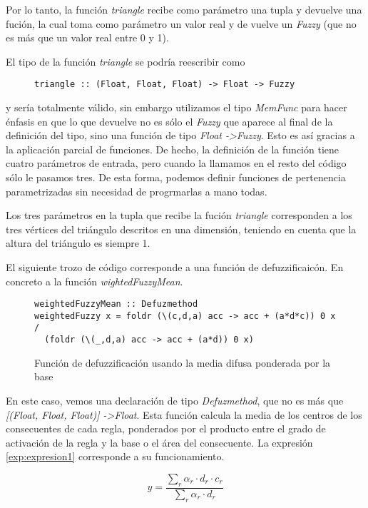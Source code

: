 Por lo tanto, la función \emph{triangle} recibe como parámetro una
tupla y devuelve una fución, la cual toma como parámetro un valor real
y de vuelve un \emph{Fuzzy} (que no es más que un valor real entre 0 y
1).

El tipo de la función \emph{triangle} se podría reescribir como
\begin{figure}
\begin{lstlisting}
triangle :: (Float, Float, Float) -> Float -> Fuzzy
\end{lstlisting}
\label{code:codigo3}
\end{figure}
y sería totalmente válido, sin embargo utilizamos el tipo
\emph{MemFunc} para hacer énfasis en que lo que devuelve no es sólo el
\emph{Fuzzy} que aparece al final de la definición del tipo, sino una
función de tipo \emph{Float -\textgreater Fuzzy}. Esto es así gracias a la
aplicación parcial de funciones. De hecho, la definición de la función
tiene cuatro parámetros de entrada, pero cuando la llamamos en el
resto del código sólo le pasamos tres. De esta forma, podemos definir
funciones de pertenencia parametrizadas sin necesidad de progrmarlas a
mano todas.

Los tres parámetros en la tupla que recibe la fución \emph{triangle}
corresponden a los tres vértices del triángulo descritos en una
dimensión, teniendo en cuenta que la altura del triángulo es siempre 1.

El siguiente trozo de código corresponde a una función de
defuzzificaicón. En concreto a la función \emph{wightedFuzzyMean}.

\begin{figure}
\begin{lstlisting}
weightedFuzzyMean :: Defuzmethod
weightedFuzzy x = foldr (\(c,d,a) acc -> acc + (a*d*c)) 0 x /
  (foldr (\(_,d,a) acc -> acc + (a*d)) 0 x)
\end{lstlisting}
\caption{Función de defuzzificación usando la media difusa ponderada
  por la base}
\label{code:codigo4}
\end{figure}

En este caso, vemos una declaración de tipo \emph{Defuzmethod}, que no
es más que \emph{[(Float, Float, Float)] -\textgreater Float}. Esta
función calcula la media de los centros de los consecuentes de cada
regla, ponderados por el producto entre el grado de activación de la
regla y la base o el área del consecuente. La expresión \ref{exp:expresion1}
corresponde a su funcionamiento.

\begin{equation}
y = \frac{\sum_{r} \alpha_{r} \cdot d_{r} \cdot c_{r}}{\sum_{r}
  \alpha_{r} \cdot d_{r}}
\label{exp:expresion1}
\end{equation}

